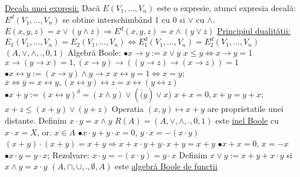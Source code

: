 \documentclass[8pt,twocolumn]{extarticle}
\begin{document}
	\underline{Decala unei expresii:} Dacă $E(V_{1}, ..., V_{n})$ este o expresie, atunci expresia decală: $E^{d}(V_{1}, ..., V_{n})$ se obtine interschimbând 1 cu 0 si $\vee$ cu $\wedge$. $E(x, y, z) = x \vee (y \wedge \overline{z}) \Rightarrow E^{d}(x, y, z) = x \wedge (y \vee \overline{z})$ \newline
	\underline{Principiul dualitătii:} $E_{1}(V_{1}, ..., V_{n}) = E_{2}(V_{1}, ..., V_{n}) \Leftrightarrow E^{d}_{1}(V_{1}, ..., V_{n}) = E^{d}_{2}(V_{1}, ..., V_{n})$ \newline
	$(A, \vee, \wedge, \bar{ }, 0, 1)$ Algebră Boole: \newline
	$\bullet x \rightarrow y := \overline{x} \vee y$ \newline
	$x \leq y \Leftrightarrow x \rightarrow y = 1$ \newline
	$x \rightarrow (y \rightarrow x) = 1, (x \rightarrow y) \rightarrow ((y \rightarrow z) \rightarrow (x \rightarrow z)) = 1$ \newline
	$\bullet x \leftrightarrow y := (x \rightarrow y) \wedge y \rightarrow x$ \newline
	$x \leftrightarrow y = 1 \Leftrightarrow x = y$; $\overline{x} \Leftrightarrow \overline{y} = x \leftrightarrow y, (x \leftrightarrow y) \leftrightarrow z = x \leftrightarrow (y \leftrightarrow z)$ \newline
	$\bullet x + y := (x \leftrightarrow y)^{d} = (\overline{x} \wedge y) \vee (\overline(y) \vee x)$ \newline
	$x + x = 0, x + y = y + x$; $x + z \leq (x+ y) \vee (y + z)$ \newline
	Operatia $(x, y) \mapsto x + y$ are proprietatile unei distante. \newline
	Definim $x \cdot y = x \wedge y$ \newline
	$R(A) = (A, \vee, \wedge, \bar{ }, 0, 1)$ este \underline{inel Boole} cu $x \cdot x = X$, or. $x \in A$ \newline
	$\bullet x \cdot y  + y \cdot x = 0$, $y \cdot x = - (x \cdot y)$ \newline
	$(x + y) \cdot (x + y) = x + y \Rightarrow x + x \cdot y + y \cdot x + y = x + y$ \newline
	$\bullet x + x = 0$, $x = -x$ \newline
	$\bullet x \cdot y = y \cdot x$; Rezolvare: $x \cdot y = - (x \cdot y) = y \cdot x$ \newline
	Definim $x \vee y := x + y + x \cdot y$ si $x \wedge y = x \cdot y$ \newline
	$(A, \cap, \cup, \bar{ }, \emptyset, A)$ este \underline{algebră Boole de functii} \newline
\end{document}
